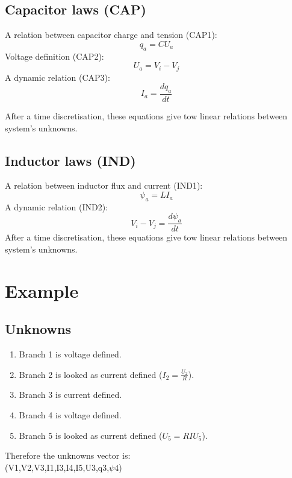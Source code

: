 \documentclass[10pt]{article}
\begin{document}
\subsection{Capacitor laws (CAP)}
A relation between capacitor charge and tension (CAP1):\\
\[ q_{a}=CU_{a} \]
Voltage definition (CAP2):
\[ U_{a}=V_{i}-V_{j} \]
A dynamic relation (CAP3):
\[ I_{a}=\frac{dq_{a}}{dt} \]

After a time discretisation, these equations give tow linear relations between system's unknowns.
\subsection{Inductor laws (IND)}
A relation between inductor flux and current (IND1):\\
\[ \psi _{a}=LI_{a} \]
A dynamic relation (IND2):
\[ V_{i}-V_{j}=\frac{d\psi _{a}}{dt} \]
After a time discretisation, these equations give tow linear relations between system's unknowns.

\section{Example}
\begin{figure}[h]
\centerline{
 \scalebox{0.5}{
    
 }
}
\end{figure}

\subsection{Unknowns}
\begin{enumerate}
\item Branch 1 is voltage defined.
\item Branch 2 is looked as current defined ($I_{2}=\frac{U_{2}}{R}$).
\item Branch 3 is current defined.
\item Branch 4 is voltage defined.
\item Branch 5 is looked as current defined ($U_{5}=RIU_{5}$).
\end{enumerate}
Therefore the unknowns vector is:\\
(V1,V2,V3,I1,I3,I4,I5,U3,q3,$\psi 4$)
\end{document}
